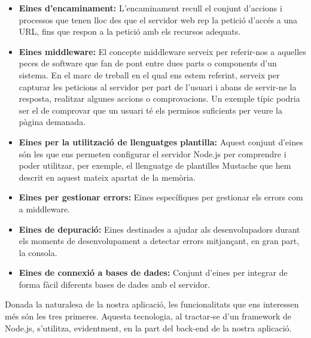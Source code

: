     \begin{itemize}
        \item \textbf{Eines d'encaminament:} L'encaminament recull el conjunt d'accions i processos que tenen lloc des que el servidor web rep la petició d'accés a una URL, fins que respon a la petició amb els recursos adequats.
        \item \textbf{Eines middleware:} El concepte middleware serveix per referir-nos a aquelles peces de software que fan de pont entre dues parts o components d'un sistema. En el marc de treball en el qual ens estem referint, serveix per capturar les peticions al servidor per part de l'usuari i abans de servir-ne la resposta, realitzar algunes accions o comprovacions. Un exemple típic podria ser el de comprovar que un usuari té els permisos suficients per veure la pàgina demanada.
        \item \textbf{Eines per la utilització de llenguatges plantilla:} Aquest conjunt d'eines són les que ens permeten configurar el servidor Node.js per comprendre i poder utilitzar, per exemple, el llenguatge de plantilles Mustache que hem descrit en aquest mateix apartat de la memòria.
        \item \textbf{Eines per gestionar errors:} Eines específiques per gestionar els errors com a middleware.
        \item \textbf{Eines de depuració:} Eines destinades a ajudar als desenvolupadors durant els moments de desenvolupament a detectar errors mitjançant, en gran part, la consola.
        \item \textbf{Eines de connexió a bases de dades:} Conjunt d'eines per integrar de forma fàcil diferents bases de dades amb el servidor.
    \end{itemize}

    Donada la naturalesa de la nostra aplicació, les funcionalitats que ens in\-te\-res\-sen més són les tres primeres. Aquesta tecnologia, al tractar-se d'un framework de Node.js, s'utilitza, evidentment, en la part del back-end de la nostra aplicació.
